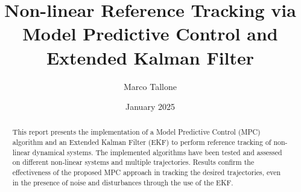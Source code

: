 \documentclass{settings/notex}
\title{Non-linear Reference Tracking via\\
	Model Predictive Control and Extended Kalman Filter\\
  \vspace{0.5cm}
  \fontsize{12pt}{12pt}\selectfont{
    Modelling and Control of Cyber-Physical Systems II\\
    \vspace{0.25cm}
    University of Trieste (UniTS)
  }
}
\author{Marco Tallone}
\date{January 2025}
\begin{document}
\maketitle

\begin{abstract}
\noindent
This report presents the implementation of a Model Predictive Control (MPC)
algorithm and an Extended Kalman Filter (EKF) to perform reference tracking of
non-linear dynamical systems. The implemented algorithms have been tested and assessed on different non-linear systems and multiple
trajectories. Results confirm the effectiveness of the proposed MPC approach in
tracking the desired trajectories, even in the presence of noise and
disturbances through the use of the EKF.
\end{abstract}








\pagebreak



% 
\end{document}
